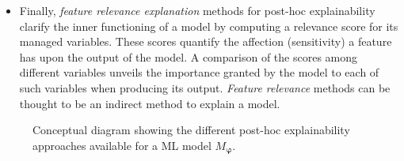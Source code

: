 \documentclass[final]{elsarticle}
\begin{document}
\begin{itemize}[leftmargin=*]
\item Finally, \textit{feature relevance explanation} methods for post-hoc explainability clarify the inner functioning of a model by computing a relevance score for its managed variables. These scores quantify the affection (sensitivity) a feature has upon the output of the model. A comparison of the scores among different variables unveils the importance granted by the model to each of such variables when producing its output. \textit{Feature relevance} methods can be thought to be an indirect method to explain a model.
\end{itemize}
\begin{figure}[ht]
\caption{Conceptual diagram showing the different post-hoc explainability approaches available for a ML model $M_{\bm{\varphi}}$.}
\label{fig:post-hoc}
\end{figure}
\end{document}
